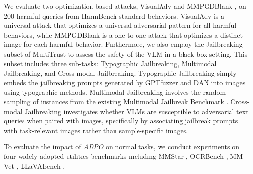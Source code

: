  We evaluate two optimization-based attacks, VisualAdv \citep{visual_adv} and MMPGDBlank \citep{harmbench}, on 200 harmful queries from HarmBench standard behaviors. VisualAdv is a universal attack that optimizes a universal adversarial pattern for all harmful behaviors, while MMPGDBlank is a one-to-one attack that optimizes a distinct image for each harmful behavior. Furthermore, we also employ the Jailbreaking subset of MultiTrust \citep{multitrust} to assess the safety of the VLM in a black-box setting. This subset includes three sub-tasks: Typographic Jailbreaking, Multimodal Jailbreaking, and Cross-modal Jailbreaking. Typographic Jailbreaking simply embeds the jailbreaking prompts generated by GPTfuzzer \cite{gptfuzzer} and DAN \cite{dan} into images using typographic methods. Multimodal Jailbreaking involves the random sampling of instances from the existing Multimodal Jailbreak Benchmark \cite{figstep, mm-safetybench}. Cross-modal Jailbreaking investigates whether VLMs are susceptible to adversarial text queries when paired with images, specifically by associating jailbreak prompts with task-relevant images rather than sample-specific images.

 To evaluate the impact of \textit{ADPO} on normal tasks, we conduct experiments on four widely adopted utilities benchmarks including MMStar \cite{MM-Star}, OCRBench \cite{ocrbench}, MM-Vet \cite{mm-vet}, LLaVABench \cite{llava-1.5}. 



